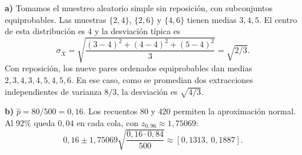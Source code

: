 \textbf{a)} Tomamos el muestreo aleatorio simple sin reposición, con subconjuntos equiprobables. Las muestras $\{2,4\}$, $\{2,6\}$ y $\{4,6\}$ tienen medias $3,4,5$. El centro de esta distribución es $4$ y la desviación típica es
\[
\sigma_{\bar X}=\sqrt{\frac{(3-4)^2+(4-4)^2+(5-4)^2}{3}}
=\boxed{\sqrt{2/3}}.
\]
Con reposición, los nueve pares ordenados equiprobables dan medias $2,3,4,3,4,5,4,5,6$. En ese caso, como se promedian dos extracciones independientes de varianza $8/3$, la desviación es $\sqrt{4/3}$.

\textbf{b)} $\hat p=80/500=0{,}16$. Los recuentos $80$ y $420$ permiten la aproximación normal. Al $92\%$ queda $0{,}04$ en cada cola, con $z_{0{,}96}\approx1{,}75069$:
\[
0{,}16\pm1{,}75069\sqrt{\frac{0{,}16\cdot0{,}84}{500}}
\approx\boxed{[0{,}1313,\ 0{,}1887]}.
\]
